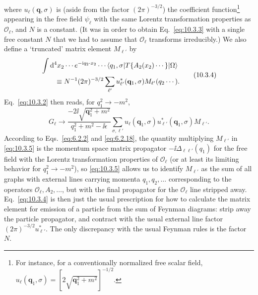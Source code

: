 where $u_\ell(\mathbf q,\sigma)$ is (aside from the factor $(2\pi)^{-3/2}$)
the coefficient function\footnote{For instance, for a conventionally
normalized free scalar field,
$u_\ell(\mathbf q_1,\sigma)=[2\sqrt{\mathbf q_1^2+m^2}]^{-1/2}$.}
appearing in the free field $\psi_\ell$ with the same Lorentz transformation
properties as $\mathcal O_\ell$, and $N$ is a constant. (It was in order to
obtain Eq.~\eqref{eq:10.3.3} with a single free constant $N$ that we had to
assume that $\mathcal O_\ell$ transforms irreducibly.) We also define a
`truncated' matrix element $M_{\ell'}$ by
\begin{equation}
\begin{split}
&\int \mathop{}\!\mathrm{d}^4x_2\cdots e^{-\mathrm{i} q_2\cdot x_2}\cdots
\langle q_1,\sigma\rvert T\{A_2(x_2)\cdots\}\lvert \Omega\rangle
\\
&\qquad\equiv N^{-1}(2\pi)^{-3/2}
\sum_{\ell'}u_{\ell'}^*(\mathbf q_1,\sigma)M_{\ell'}(q_2\cdots).
\end{split}
\tag{10.3.4}\label{eq:10.3.4}
\end{equation}
Eq.~\eqref{eq:10.3.2} then reads, for $q_1^2\to-m^2$,
\begin{equation}
G_\ell\to
\frac{-2\ii\sqrt{\mathbf q_1^2+m^2}}{q_1^2+m^2-\ii\epsilon}
\sum_{\sigma,\ell'}u_\ell(\mathbf q_1,\sigma)
u_{\ell'}^*(\mathbf q_1,\sigma)M_{\ell'}.
\tag{10.3.5}\label{eq:10.3.5}
\end{equation}
According to Eqs.~\eqref{eq:6.2.2} and \eqref{eq:6.2.18}, the quantity
multiplying $M_{\ell'}$ in \eqref{eq:10.3.5} is the momentum space matrix
propagator $-\ii\Delta_{\ell\ell'}(q_1)$ for the free field with the Lorentz
transformation properties of $\mathcal O_\ell$ (or at least its limiting
behavior for $q_1^2\to-m^2$), so \eqref{eq:10.3.5} allows us to identify
$M_{\ell'}$ as the sum of all graphs with external lines carrying momenta
$q_1,q_2,\ldots$ corresponding to the operators $\mathcal O_\ell,A_2,\ldots$,
but with the final propagator for the $\mathcal O_\ell$ line stripped away.
Eq.~\eqref{eq:10.3.4} is then just the usual prescription for how to calculate
the matrix element for emission of a particle from the sum of Feynman diagrams:
strip away the particle propagator, and contract with the usual external line
factor $(2\pi)^{-3/2}u_{\ell'}^*$. The only discrepancy with the usual Feynman
rules is the factor $N$.

